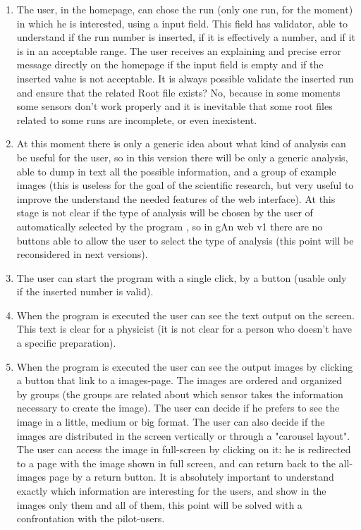 \begin{enumerate}

\item The user, in the homepage, can chose the run (only one run, for the moment) in which he is interested, using a input field. This field has validator, able to understand if the run number is inserted, if it is effectively a number, and if it is in an acceptable range. The user receives an explaining and precise error message directly on the homepage if the input field is empty and if the inserted value is not acceptable. It is always possible validate the inserted run and ensure that the related Root file exists? No, because in some moments some sensors don't work properly and it is inevitable that some root files related to some runs are incomplete, or even inexistent.

\item At this moment there is only a generic idea about what kind of analysis can be useful for the user, so in this version there will be only a generic analysis, able to dump in text all the possible information, and a group of example images (this is useless for the goal of the scientific research, but very useful to improve the understand the needed features of the web interface).
At this stage is not clear if the type of analysis will be chosen by the user of automatically selected by the program , so in gAn web v1 there are no buttons able to allow the user to select the type of analysis (this point will be reconsidered in next versions).

\item The user can start the program with a single click, by a button (usable only if the inserted number is valid).

\item When the program is executed the user can see the text output on the screen. This text is clear for a physicist (it is not clear for a person who doesn't have a specific preparation). 

\item When the program is executed the user can see the output images by clicking a button that link to a images-page. The images are ordered and organized by groups (the groups are related about which sensor takes the information necessary to create the image). The user can decide if he prefers to see the image in a little, medium or big format. The user can also decide if the images are distributed in the screen vertically or through a "carousel layout". The user can access the image in full-screen by clicking on it: he is redirected to a page with the image shown in full screen, and can return back to the all-images page by a return button. It is absolutely important to understand exactly which information are interesting for the users, and show in the images only them and all of them, this point will be solved with a confrontation with the pilot-users. 


\end{enumerate}
